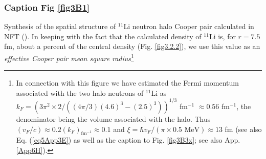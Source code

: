 \subsubsection{Caption Fig \ref{fig3B1}}
         Synthesis of the spatial structure of $^{11}$Li neutron halo Cooper pair calculated in NFT (\cite{Barranco:01}). In keeping with the fact that the calculated density of $^{11}$Li is, for $r=7.5$ fm, about a percent of the central density (Fig. \ref{fig3.2.2}), we use this value as an \textit{effective Cooper pair mean square radius}\footnote{In connection with this figure we have estimated the Fermi momentum associated with the two halo neutrons of $^{11}$Li as $k_F=(3\pi^2\times2/((4\pi/3)(4.6)^3-(2.5)^3))^{1/3}$ fm$^{-1}$ $\approx0.56$ fm$^{-1}$, the denominator being the volume associated with the halo. Thus $(v_F/c)\approx0.2(k_F)_{\text{fm}^{-1}}\approx 0.1$ and $\xi=\hbar v_F/(\pi\times0.5\text{ MeV})\approx 13$ fm (see also Eq. (\ref{eq5App3E}) as well as the  caption to Fig. \ref{fig3B3x}; see also App. \ref{App6H}).
         	
}
